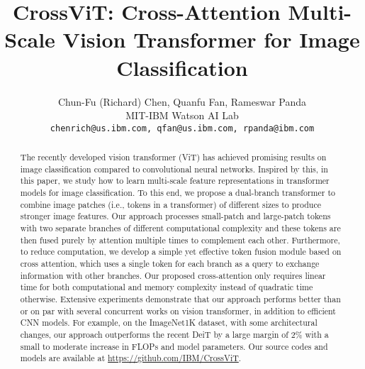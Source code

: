 \documentclass[10pt,twocolumn,letterpaper]{article}
\begin{document}
\title{CrossViT: Cross-Attention Multi-Scale Vision Transformer for Image Classification}

\author{Chun-Fu (Richard) Chen, Quanfu Fan, Rameswar Panda\\
MIT-IBM Watson AI Lab\\
{\tt\small chenrich@us.ibm.com, qfan@us.ibm.com, rpanda@ibm.com}
}

\maketitle
\ificcvfinal\thispagestyle{empty}\fi

\begin{abstract}
The recently developed vision transformer (ViT) has achieved promising results on image classification compared to convolutional neural networks. Inspired by this, in this paper, we study how to learn multi-scale feature representations in transformer models for image classification. To this end, we propose a dual-branch transformer to combine image patches (i.e., tokens in a transformer) of different sizes to produce stronger image features. Our approach processes small-patch and large-patch tokens with two separate branches of different computational complexity and these tokens are then fused purely by attention multiple times to complement each other. Furthermore, to reduce computation, we develop a simple yet effective token fusion module based on cross attention, which uses a single token for each branch as a query to exchange information with other branches. Our proposed cross-attention only requires linear time for both computational and memory complexity instead of quadratic time otherwise. Extensive experiments demonstrate that our approach performs better than or on par with several concurrent works on vision transformer, in addition to efficient CNN models. For example, on the ImageNet1K dataset, with some architectural changes, our approach outperforms the recent DeiT by a large margin of 2\% with a small to moderate increase in FLOPs and model parameters. Our source codes and models are available at \url{https://github.com/IBM/CrossViT}.















   
\end{abstract}
\end{document}
